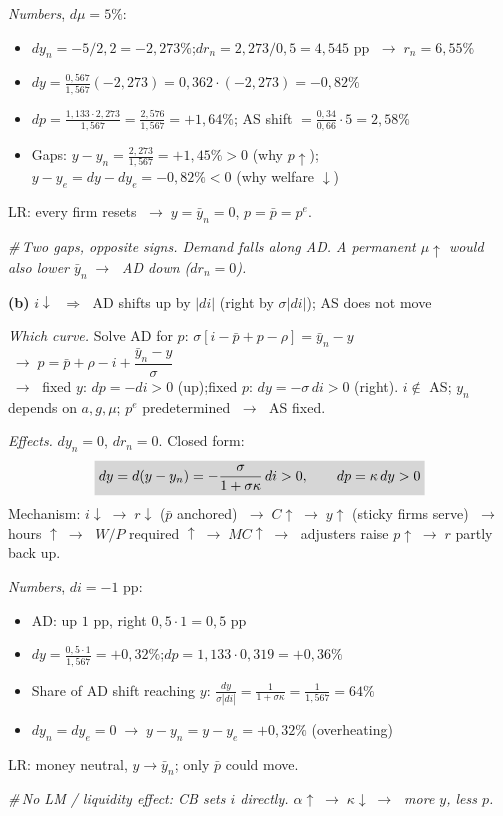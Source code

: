 \documentclass[11pt, a4paper]{article}
\newcommand{\res}[1]{\colorbox{hl}{$\displaystyle #1$}}
\newcommand{\rest}[1]{\colorbox{hl}{#1}}
\newcommand{\nota}[1]{\par\hfill\textcolor{margem}{\small\itshape\#\,#1}\par}
\newcommand{\itm}[1]{\par\smallskip\needspace{3\baselineskip}\noindent\textbf{(#1)}\quad}
\newcommand{\ra}{\;\rightarrow\;}
\begin{document}
\emph{Numbers}, $d\mu=5\%$:
\begin{itemize}
\item $dy_n=-5/2{,}2=-2{,}273\%$;\quad $dr_n=2{,}273/0{,}5=4{,}545$ pp $\ra r_n=6{,}55\%$
\item $dy=\tfrac{0{,}567}{1{,}567}(-2{,}273)=0{,}362\cdot(-2{,}273)=-0{,}82\%$
\item $dp=\tfrac{1{,}133\cdot2{,}273}{1{,}567}=\tfrac{2{,}576}{1{,}567}=+1{,}64\%$;\quad
      AS shift $=\tfrac{0{,}34}{0{,}66}\cdot5=2{,}58\%$
\item Gaps: $y-y_n=\tfrac{2{,}273}{1{,}567}=+1{,}45\%>0$ (why $p\uparrow$);\quad
      $y-y_e=dy-dy_e=-0{,}82\%<0$ (why welfare $\downarrow$)
\end{itemize}
LR: every firm resets $\ra y=\bar y_n=0$, $p=\bar p=p^e$.
\nota{Two gaps, opposite signs. Demand falls \emph{along} AD. A permanent $\mu\uparrow$ would also
lower $\bar y_n\ra$ AD down ($dr_n=0$).}

\itm{b} \textbf{$i\downarrow$} $\;\Rightarrow\;$ \rest{AD shifts up by $|di|$ (right by $\sigma|di|$); AS does not move}

\emph{Which curve.} Solve AD for $p$: $\sigma\left[i-\bar p+p-\rho\right]=\bar y_n-y$
$\ra p=\bar p+\rho-i+\dfrac{\bar y_n-y}{\sigma}$\\
$\ra$ fixed $y$: $dp=-di>0$ (up);\quad fixed $p$: $dy=-\sigma\,di>0$ (right).
$i\notin$ AS; $y_n$ depends on $a,g,\mu$; $p^e$ predetermined $\ra$ AS fixed.

\emph{Effects.} $dy_n=0$, $dr_n=0$. Closed form:
\[
\res{dy=d(y-y_n)=-\frac{\sigma}{1+\sigma\kappa}\,di>0,\qquad dp=\kappa\,dy>0}
\]
Mechanism: $i\downarrow\ra r\downarrow$ ($\bar p$ anchored) $\ra C\uparrow\ra y\uparrow$ (sticky
firms serve) $\ra$ hours $\uparrow\ra$ $W/P$ required $\uparrow\ra MC\uparrow\ra$ adjusters raise
$p\uparrow\ra r$ partly back up.

\emph{Numbers}, $di=-1$ pp:
\begin{itemize}
\item AD: up $1$ pp, right $0{,}5\cdot1=0{,}5$ pp
\item $dy=\tfrac{0{,}5\cdot1}{1{,}567}=+0{,}32\%$;\quad $dp=1{,}133\cdot0{,}319=+0{,}36\%$
\item Share of AD shift reaching $y$: $\tfrac{dy}{\sigma|di|}=\tfrac1{1+\sigma\kappa}=\tfrac1{1{,}567}=64\%$
\item $dy_n=dy_e=0\ra y-y_n=y-y_e=+0{,}32\%$ (overheating)
\end{itemize}
LR: money neutral, $y\to\bar y_n$; only $\bar p$ could move.
\nota{No LM / liquidity effect: CB sets $i$ directly. $\alpha\uparrow\ra\kappa\downarrow\ra$ more $y$, less $p$.}
\end{document}
